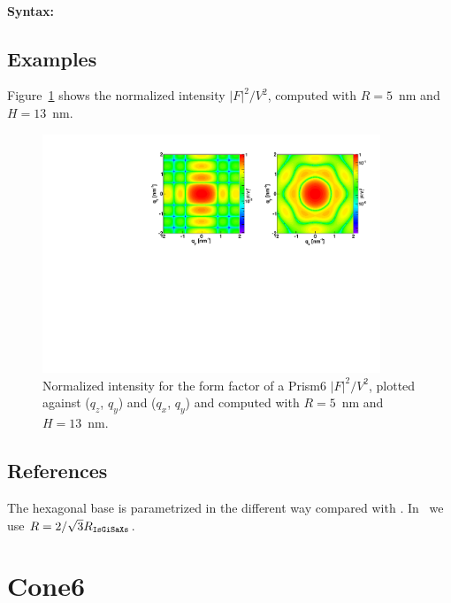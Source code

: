 \paragraph{Syntax:}  

\subsection{Examples}
Figure~\ref{figFFprism6Ex} shows the normalized intensity
$|F|^2/V^2$, computed with $R=5$~nm and $H=13$~nm.

\begin{figure}[h]
\begin{center}
\includegraphics[width=0.9\textwidth]{Figures/figffprism6}
\end{center}
\caption{Normalized intensity for the form factor of a Prism6
  $|F|^2/V^2$, plotted against ($q_z$, $q_y$) and ($q_x$, $q_y$) and computed with $R=5$~nm and $H=13$~nm.}
\label{figFFprism6Ex}
\end{figure}

\FloatBarrier

\subsection{References}
The hexagonal base is parametrized in the different way compared with
. In \BornAgain\, we use $R = 2/\sqrt{3}R_{\text{\texttt{IsGiSaXs}}}$.


\newpage{\cleardoublepage}
\section{Cone6}  

